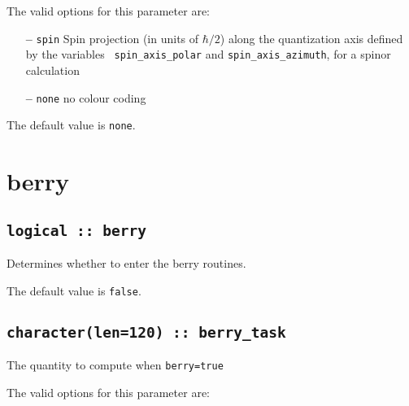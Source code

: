 The valid options for this parameter are:
\begin{itemize}
\item[{\bf --}] \verb#spin# Spin projection (in units of $\hbar/2$)
  along the quantization axis defined by the variables {\tt
    spin\_axis\_polar} and {\tt spin\_axis\_azimuth}, for a spinor
  calculation
\item[{\bf --}]  \verb#none# no colour coding
\end{itemize}

The default value is {\tt none}.


\clearpage
\section{berry}

\subsection[berry]{\tt logical :: berry}
Determines whether to enter the berry routines.

The default value is \verb#false#.


\subsection[berry\_task]{\tt character(len=120) ::  berry\_task}
The quantity to compute when {\tt berry=true}

The valid options for this parameter are:

